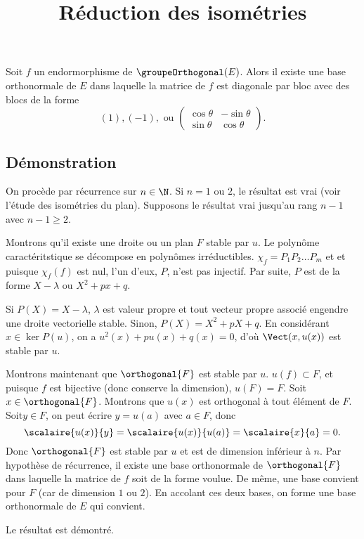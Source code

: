 \documentclass[fontsize=12pt,twoside=false,parskip=half, french]{scrartcl}
\title{Réduction des isométries}
\date{}
\author{}
\begin{document}
\maketitle
   \begin{Theoreme}
      Soit $f$ un endormorphisme de $\groupeOrthogonal(E)$. Alors il existe une base orthonormale de $E$ dans laquelle 
      la matrice de $f$ est diagonale par bloc avec des blocs de la forme
      \[
         (1), (-1), \text{ ou }
         \begin{pmatrix}
            \cos \theta & - \sin \theta \\
            \sin \theta & \cos \theta
         \end{pmatrix}.
      \]
   \end{Theoreme}
   \subsection{Démonstration}
      On procède par récurrence sur $n \in \N$. Si $n = 1$ ou $2$, le résultat est vrai (voir l’étude des isométries
      du plan). Supposons le résultat vrai jusqu’au rang $n - 1$ avec $n - 1 \geq 2$. 
      
      Montrons qu’il existe une droite ou un plan $F$ stable par $u$. Le polynôme caractéritstique se décompose en 
      polynômes irréductibles. $\chi_f = P_1P_2\ldots P_m$ et et puisque $\chi_f(f)$ est nul, l’un d’eux, $P$, n’est 
      pas injectif. Par suite, $P$ est de la forme $X - \lambda$ ou $X^2 + px + q$. 
      
      Si $P(X) = X - \lambda$, $\lambda$ est valeur propre et tout vecteur propre associé engendre une droite 
      vectorielle stable. Sinon, $P(X) = X^2 + pX + q$. En considérant $x \in \ker P(u)$, on a $u^2(x) + pu(x) + q(x) = 0$,
      d’où $\Vect(x, u(x))$ est stable par $u$.
      
      Montrons maintenant que $\orthogonal{F}$ est stable par $u$. $u(f) \subset F$, et puisque $f$ est bijective 
      (donc conserve la dimension), $u(F) = F$. Soit $x \in \orthogonal{F}$. Montrons que $u(x)$ est orthogonal à 
      tout élément de $F$. Soit$y \in F$, on peut écrire $y = u(a)$ avec $a \in F$, donc
      \[
         \scalaire{u(x)}{y} = \scalaire{u(x)}{u(a)} = \scalaire{x}{a} = 0.
      \]
      Donc $\orthogonal{F}$ est stable par $u$ et est de dimension inférieur à $n$. Par hypothèse de récurrence, il 
      existe une base orthonormale de $\orthogonal{F}$ dans laquelle la matrice de $f$ soit de la forme voulue. De même,
      une base convient pour $F$ (car de dimension $1$ ou $2$). En accolant ces deux bases, on forme une base 
      orthonormale de $E$ qui convient.
      
      Le résultat est démontré.
\end{document}
